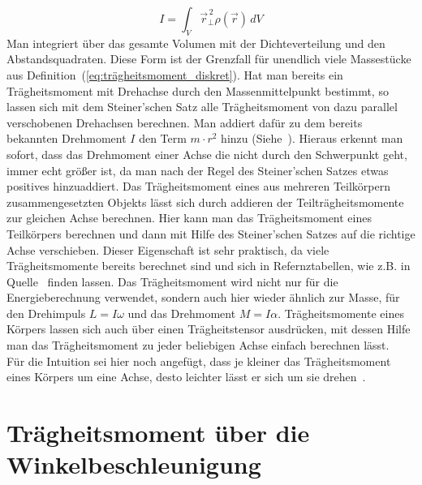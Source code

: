 \documentclass{article}
\begin{document}
		\begin{equation}
			I = \int_V \vec{r}_{\bot}^{\,2} \rho(\vec{r}) \,dV
		\end{equation}
		Man integriert über das gesamte Volumen mit der Dichteverteilung und den Abstandsquadraten. Diese Form ist der Grenzfall für unendlich viele Massestücke aus Definition~(\ref{eq:trägheitsmoment_diskret}).
		Hat man bereits ein Trägheitsmoment mit Drehachse durch den Massenmittelpunkt bestimmt, so lassen sich mit dem Steiner'schen Satz alle Trägheitsmoment von dazu parallel verschobenen Drehachsen berechnen.
		Man addiert dafür zu dem bereits bekannten Drehmoment \(I\) den Term \(m \cdot r^2\) hinzu (Siehe~\cite{Steiner}). Hieraus erkennt man sofort, dass das Drehmoment einer Achse die nicht 
		durch den Schwerpunkt geht, immer echt größer ist, da man nach der Regel des Steiner'schen Satzes etwas positives hinzuaddiert.
		Das Trägheitsmoment eines aus mehreren Teilkörpern zusammengesetzten Objekts lässt sich durch addieren der Teilträgheitsmomente zur gleichen Achse berechnen.
		Hier kann man das Trägheitsmoment eines Teilkörpers berechnen und dann mit Hilfe des Steiner'schen Satzes auf die richtige Achse verschieben.
		Dieser Eigenschaft ist sehr praktisch, da viele Trägheitsmomente bereits berechnet sind und sich in Refernztabellen, wie z.B. in Quelle~\cite{HallidayPhysik} finden lassen.
		Das Trägheitsmoment wird nicht nur für die Energieberechnung verwendet, sondern auch hier wieder ähnlich zur Masse, für den Drehimpuls \(L = I \omega \) und das Drehmoment \(M = I \alpha \).
		Trägheitsmomente eines Körpers lassen sich auch über einen Trägheitstensor ausdrücken, mit dessen Hilfe man das Trägheitsmoment zu jeder beliebigen Achse einfach berechnen lässt. \\
		Für die Intuition sei hier noch angefügt, dass je kleiner das Trägheitsmoment eines Körpers um eine Achse, desto leichter lässt er sich um sie drehen~\cite{HallidayPhysik}.

	\section{Trägheitsmoment über die Winkelbeschleunigung}
\end{document}
